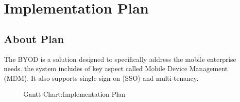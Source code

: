 \graphicspath{ {images/} }
\chapter{Implementation Plan}
\thispagestyle{empty}
\section{About Plan}
\par \hspace{5mm} The BYOD is a solution designed to specifically address the mobile enterprise needs. the system includes of key aspect called Mobile Device Management (MDM). It also supports single sign-on (SSO) and multi-tenancy. 

\begin{figure}[h!]
\begin{center}
\end{center}
\caption {Gantt Chart:Implementation Plan}
\label{vmb2}
\vspace{0mm}
\end{figure}